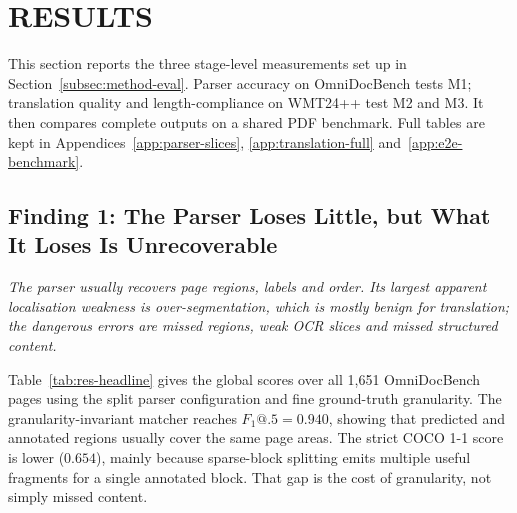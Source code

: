 \section{RESULTS}
\label{sec:results}

This section reports the three stage-level measurements set up in
Section~\ref{subsec:method-eval}. Parser accuracy on OmniDocBench tests M1;
translation quality and length-compliance on WMT24++ test M2 and M3. It then
compares complete outputs on a shared PDF benchmark. Full tables are kept in
Appendices~\ref{app:parser-slices}, \ref{app:translation-full}
and~\ref{app:e2e-benchmark}.

\subsection{Finding 1: The Parser Loses Little, but What It Loses Is
Unrecoverable}
\label{subsec:res-parser}

\emph{The parser usually recovers page regions, labels and order. Its largest
apparent localisation weakness is over-segmentation, which is mostly benign for
translation; the dangerous errors are missed regions, weak OCR slices and missed
structured content.}

Table~\ref{tab:res-headline} gives the global scores over all 1{,}651
OmniDocBench pages using the split parser configuration and fine ground-truth
granularity. The granularity-invariant matcher reaches $F_1@.5=0.940$, showing
that predicted and annotated regions usually cover the same page areas. The
strict COCO 1-1 score is lower ($0.654$), mainly because sparse-block splitting
emits multiple useful fragments for a single annotated block. That gap is the
cost of granularity, not simply missed content.


